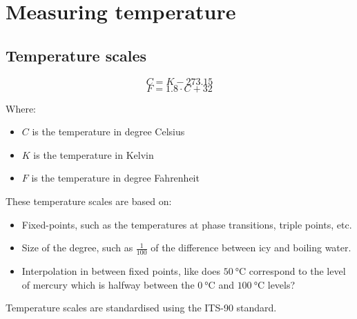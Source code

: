 \documentclass[11pt]{article}
\begin{document}
 \newpage
\section{Measuring temperature}
\label{sec:org151ea3f}

\subsection{Temperature scales}
\label{sec:org563a476}
\[C = K - 273.15\]
\[F = 1.8 \cdot C + 32\]

Where:
\begin{itemize}
\item \(C\) is the temperature in degree Celsius
\item \(K\) is the temperature in Kelvin
\item \(F\) is the temperature in degree Fahrenheit
\end{itemize}

These temperature scales are based on:
\begin{itemize}
\item Fixed-points, such as the temperatures at phase transitions, triple points, etc.
\item Size of the degree, such as \(\frac{1}{100}\) of the difference between icy and boiling water.
\item Interpolation in between fixed points, like does \(\qty{50}{\degreeCelsius}\) correspond to the level of mercury which is halfway between the \(\qty{0}{\degreeCelsius}\) and \(\qty{100}{\degreeCelsius}\) levels?
\end{itemize}

Temperature scales are standardised using the ITS-90 standard.

 \newpage
\end{document}
